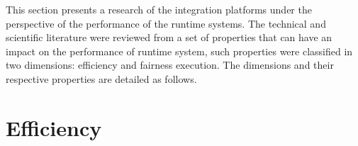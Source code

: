 \label{cap:stateofart}
\noindent 
This section presents a research of the integration platforms under the perspective of the performance of the runtime systems. The technical and scientific literature were reviewed from a set of properties that can have an impact on the performance of runtime system, such properties were classified in two dimensions: efficiency and fairness execution. The dimensions and their respective properties are detailed as follows.

\section{Efficiency}
\label{sec:efficiency}

